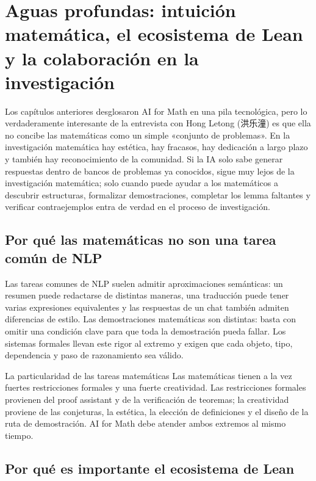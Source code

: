 \section{Aguas profundas: intuición matemática, el ecosistema de Lean y la colaboración en la investigación}

Los capítulos anteriores desglosaron AI for Math en una pila tecnológica, pero lo verdaderamente interesante de la entrevista con Hong Letong (洪乐潼) es que ella no concibe las matemáticas como un simple «conjunto de problemas». En la investigación matemática hay estética, hay fracasos, hay dedicación a largo plazo y también hay reconocimiento de la comunidad. Si la IA solo sabe generar respuestas dentro de bancos de problemas ya conocidos, sigue muy lejos de la investigación matemática; solo cuando puede ayudar a los matemáticos a descubrir estructuras, formalizar demostraciones, completar los lemma faltantes y verificar contraejemplos entra de verdad en el proceso de investigación.

\subsection{Por qué las matemáticas no son una tarea común de NLP}

Las tareas comunes de NLP suelen admitir aproximaciones semánticas: un resumen puede redactarse de distintas maneras, una traducción puede tener varias expresiones equivalentes y las respuestas de un chat también admiten diferencias de estilo. Las demostraciones matemáticas son distintas: basta con omitir una condición clave para que toda la demostración pueda fallar. Los sistemas formales llevan este rigor al extremo y exigen que cada objeto, tipo, dependencia y paso de razonamiento sea válido.

\begin{importantbox}{La particularidad de las tareas matemáticas}
Las matemáticas tienen a la vez fuertes restricciones formales y una fuerte creatividad. Las restricciones formales provienen del proof assistant y de la verificación de teoremas; la creatividad proviene de las conjeturas, la estética, la elección de definiciones y el diseño de la ruta de demostración. AI for Math debe atender ambos extremos al mismo tiempo.
\end{importantbox}

\subsection{Por qué es importante el ecosistema de Lean}

